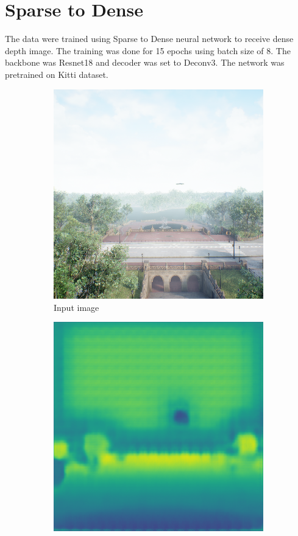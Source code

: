 \documentclass[twoside]{ctuthesis}
\theoremstyle{plain}
\theoremstyle{definition}
\theoremstyle{note}
\begin{document}
\section{Sparse to Dense}
The data were trained using Sparse to Dense neural network to receive dense depth image. The training was done for 15 epochs using batch size of 8. The backbone was Resnet18 and decoder was set to Deconv3. The network was pretrained on Kitti dataset.
\begin{figure}
	\centering
	\begin{subfigure}[b]{0.4\textwidth}
		\centering
		\includegraphics[width=\textwidth]{s2d_input.png}
		\caption{Input image}
	\end{subfigure}
	\hfill
	\begin{subfigure}[b]{0.4\textwidth}
		\centering
		\includegraphics[width=\textwidth]{s2d_output.png}

\end{subfigure}
\end{figure}
\end{document}
